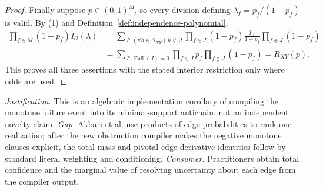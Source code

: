 \documentclass{article}
\begin{document}
\begin{proof}
Finally suppose \(p\in(0,1)^M\), so every division defining \(\lambda_f=p_f/(1-p_f)\) is valid.  By (1) and Definition~\ref{def:independence-polynomial},
\[
\begin{aligned}
 \prod_{f\in M}(1-p_f)I_{\mathcal O}(\lambda)
 &=\sum_{J:\,(\forall h\in\mathcal O_{XY})\,h\nsubseteq J}
 \prod_{f\in J}(1-p_f)\frac{p_f}{1-p_f}
 \prod_{f\notin J}(1-p_f)\\
 &=\sum_{J:\,\operatorname{Fail}(J)=0}
 \prod_{f\in J}p_f\prod_{f\notin J}(1-p_f)
 =R_{XY}(p).
\end{aligned}
\]
This proves all three assertions with the stated interior restriction only where odds are used.
\end{proof}
\par\smallskip\noindent \textit{Justification.} This is an algebraic implementation corollary of compiling the monotone failure event into its minimal-support antichain, not an independent novelty claim. \textit{Gap.} Akbari et al. use products of edge probabilities to rank one realization; after the new obstruction compiler makes the negative monotone clauses explicit, the total mass and pivotal-edge derivative identities follow by standard literal weighting and conditioning. \textit{Consumer.} Practitioners obtain total confidence and the marginal value of resolving uncertainty about each edge from the compiler output.
\end{document}
